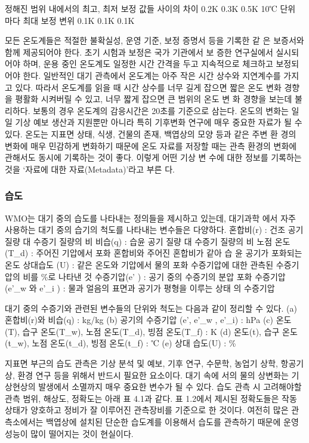정해진 범위 내에서의 최고, 최저 보정 값들 사이의 차이
0.2K 0.3K 0.5K
10℃ 단위 마다 최대 보정 변위
0.1K 0.1K 0.1K

모든 온도계들은 적절한 불확실성, 운영 기준, 보정 증명서 등을 기록한 같
은 보증서와 함께 제공되어야 한다. 초기 시험과 보정은 국가 기관에서 보
증한 연구실에서 실시되어야 하며, 운용 중인 온도계도 일정한 시간 간격을
두고 지속적으로 체크하고 보정되어야 한다.
일반적인 대기 관측에서 온도계는 아주 작은 시간 상수와 지연계수를 가지
고 있다. 따라서 온도계를 읽을 때 시간 상수를 너무 길게 잡으면 짧은 온도
변화 경향을 평활화 시켜버릴 수 있고, 너무 짧게 잡으면 큰 범위의 온도 변
화 경향을 보는데 불리하다.
보통의 경우 온도계의 감응시간은 20초를 기준으로 삼는다. 온도의 변화는
일일 기상 예보 생산과 지원뿐만 아니라 특히 기후변화 연구에 매우 중요한
자료가 될 수 있다.
온도는 지표면 상태, 식생, 건물의 존재, 백엽상의 모양 등과 같은 주변 환
경의 변화에 매우 민감하게 변화하기 때문에 온도 자료를 저장할 때는 관측
환경의 변화에 관해서도 동시에 기록하는 것이 좋다. 이렇게 어떤 기상 변
수에 대한 정보를 기록하는 것을 ‘자료에 대한 자료(Metadata)’라고 부른
다.

\subsubsection{습도}

WMO는 대기 중의 습도를 나타내는 정의들을 제시하고 있는데, 대기과학
에서 자주 사용하는 대기 중의 습기의 척도를 나타내는 변수들은 다양하다.
혼합비(r) : 건조 공기 질량 대 수증기 질량의 비
비습(q) : 습윤 공기 질량 대 수증기 질량의 비
노점 온도(T_d) : 주어진 기압에서 포화 혼합비와 주어진 혼합비가 같아 습
윤 공기가 포화되는 온도
상대습도 (U) : 같은 온도와 기압에서 물의 포화 수증기압에 대한 관측된
수증기압의 비를 \%로 나타낸 것
수증기압(e' ) : 공기 중의 수증기의 분압
포화 수증기압(e'_w 와 e'_i ) : 물과 얼음의 표면과 공기가 평형을 이루는 상태
의 수증기압

대기 중의 수증기와 관련된 변수들의 단위와 척도는 다음과 같이 정리할 수 있다.
(a) 혼합비(r)와 비습(q) : kg/kg
(b) 공기의 수증기압 (e', e'_w , e'_i) : hPa
(c) 온도(T), 습구 온도(T_w), 노점 온도(T_d), 빙점 온도(T_f) : K
(d) 온도(t), 습구 온도(t_w), 노점 온도(t_d), 빙점 온도(t_f) : ℃
(e) 상대 습도(U) : \%

지표면 부근의 습도 관측은 기상 분석 및 예보, 기후 연구, 수문학, 농업기
상학, 항공기상, 환경 연구 등을 위해서 반드시 필요한 요소이다. 대기 속에
서의 물의 상변화는 기상현상의 발생에서 소멸까지 매우 중요한 변수가 될
수 있다. 습도 관측 시 고려해야할 관측 범위, 해상도, 정확도는 아래 표
4.1과 같다. 표 1.2에서 제시된 정확도들은 작동 상태가 양호하고 정비가
잘 이루어진 관측장비를 기준으로 한 것이다. 여전히 많은 관측소에서는
백엽상에 설치된 단순한 습도계를 이용해서 습도를 관측하기 때문에 운영
성능이 많이 떨어지는 것이 현실이다.

